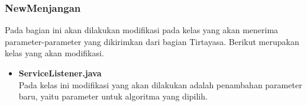 \subsubsection{NewMenjangan}
Pada bagian ini akan dilakukan modifikasi pada kelas yang akan menerima parameter-parameter yang dikirimkan dari bagian Tirtayasa. Berikut merupakan kelas yang akan modifikasi.

\begin{itemize}
    \item \textbf{ServiceListener.java}
    \\ Pada kelas ini modifikasi yang akan dilakukan adalah penambahan parameter baru, yaitu parameter untuk algoritma yang dipilih.
\end{itemize}

\begin{comment}
Pada bagian \textit{front-end} perubahan utama terdapat pada antarmuka seperti yang sudah dijelaskan pada sub-bab \ref{sec:rancanganui}. Oleh karena itu, perlu dilakukan juga modifikasi pada protokol API, yaitu akan dilakukan modifikasi pada kelas-kelas yang berkaitan dalam pengiriman data ke bagian \textit{back-end}. Modifikasi tersebut bertujuan agar parameter baru, yaitu algoritma dapat dikirimkan ke bagian \textit{back-end} dengan baik. Pada kelas-kelas tersebut akan ditambahkan paramater baru, yaitu parameter yang akan mengirimkan algoritma yang dipilih. Pada bagian \textit{back-end}, parameter / data algoritma tersebut akan diterima dalam bentuk string. Kemudian dari data string tersebut akan dimanfaatkan sistem untuk memilih algoritma apa yang akan dijalankan untuk melakukan pencarian jalur terpendek.
\end{comment}